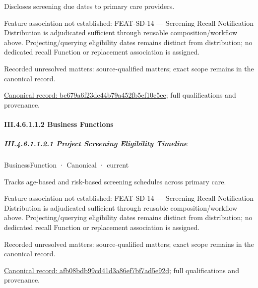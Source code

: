 Discloses screening due dates to primary care providers.



Feature association not established: FEAT-SD-14 — Screening Recall Notification Distribution is adjudicated sufficient through reusable composition/workflow above. Projecting/querying eligibility dates remains distinct from distribution; no dedicated recall Function or replacement association is assigned.


{\small Recorded unresolved matters: source-qualified matters; exact scope remains in the canonical record.}\par
{\footnotesize \href{../../../../../../../continuum/business/business-service/bc679a6f23de44b79a452fb5ef10c5ee.md}{Canonical record: bc679a6f23de44b79a452fb5ef10c5ee}; full qualifications and provenance.}\par
\paragraph*{III.4.6.1.1.2 Business Functions}
\label{navigation:III.4.6.1.1.2}

\subparagraph*{III.4.6.1.1.2.1 Project Screening Eligibility Timeline}
\label{navigation:III.4.6.1.1.2.1}

\label{element:afb08bdb99cd41d3a86ef7bf7ad5e92d}
{\small BusinessFunction · Canonical · current}\par

Tracks age-based and risk-based screening schedules across primary care.



Feature association not established: FEAT-SD-14 — Screening Recall Notification Distribution is adjudicated sufficient through reusable composition/workflow above. Projecting/querying eligibility dates remains distinct from distribution; no dedicated recall Function or replacement association is assigned.


{\small Recorded unresolved matters: source-qualified matters; exact scope remains in the canonical record.}\par
{\footnotesize \href{../../../../../../../continuum/business/business-function/afb08bdb99cd41d3a86ef7bf7ad5e92d.md}{Canonical record: afb08bdb99cd41d3a86ef7bf7ad5e92d}; full qualifications and provenance.}\par
